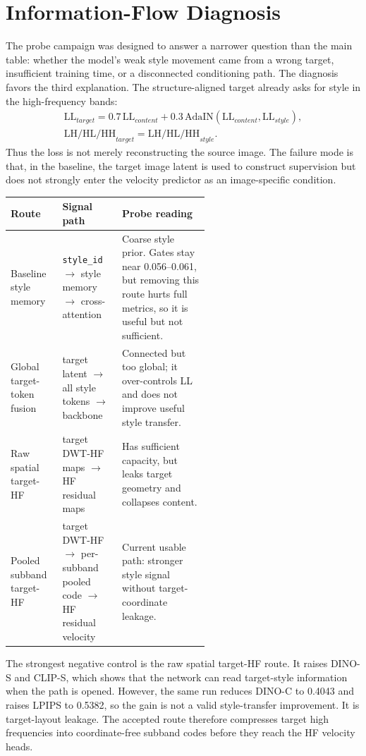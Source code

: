 \documentclass[10pt,twocolumn]{article}
\newcommand{\dinos}{DINO-S}
\newcommand{\dinoc}{DINO-C}
\newcommand{\clips}{CLIP-S}
\begin{document}
\section{Information-Flow Diagnosis}

The probe campaign was designed to answer a narrower question than the main table:
whether the model's weak style movement came from a wrong target, insufficient training
time, or a disconnected conditioning path. The diagnosis favors the third explanation.
The structure-aligned target already asks for style in the high-frequency bands:
\[
  \begin{array}{l}
  \mathrm{LL}_{target}=0.7\,\mathrm{LL}_{content}
  +0.3\,\mathrm{AdaIN}(\mathrm{LL}_{content},\mathrm{LL}_{style}),\\
  \mathrm{LH/HL/HH}_{target}=\mathrm{LH/HL/HH}_{style}.
  \end{array}
\]
Thus the loss is not merely reconstructing the source image. The failure mode is that,
in the baseline, the target image latent is used to construct supervision but does not
strongly enter the velocity predictor as an image-specific condition.

\begin{center}
\footnotesize
\begin{tabularx}{\linewidth}{p{0.26\linewidth}p{0.30\linewidth}X}
\toprule
Route & Signal path & Probe reading \\
\midrule
Baseline style memory & \texttt{style\_id} \(\rightarrow\) style memory \(\rightarrow\) cross-attention & Coarse style prior. Gates stay near 0.056--0.061, but removing this route hurts full metrics, so it is useful but not sufficient. \\
Global target-token fusion & target latent \(\rightarrow\) all style tokens \(\rightarrow\) backbone & Connected but too global; it over-controls LL and does not improve useful style transfer. \\
Raw spatial target-HF & target DWT-HF maps \(\rightarrow\) HF residual maps & Has sufficient capacity, but leaks target geometry and collapses content. \\
Pooled subband target-HF & target DWT-HF \(\rightarrow\) per-subband pooled code \(\rightarrow\) HF residual velocity & Current usable path: stronger style signal without target-coordinate leakage. \\
\bottomrule
\end{tabularx}
\normalsize
\end{center}

The strongest negative control is the raw spatial target-HF route. It raises \dinos{}
and \clips{}, which shows that the network can read target-style information when the
path is opened. However, the same run reduces \dinoc{} to 0.4043 and raises LPIPS to
0.5382, so the gain is not a valid style-transfer improvement. It is target-layout
leakage. The accepted route therefore compresses target high frequencies into
coordinate-free subband codes before they reach the HF velocity heads.
\end{document}
